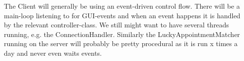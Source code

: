 The Client will generally be using an event-driven control flow. There will be a main-loop listening to for GUI-events and when an event happens it is handled by the relevant controller-class. We still might want to have several threads running, e.g. the ConnectionHandler. Similarly the LuckyAppointmentMatcher running on the server will probably be pretty procedural as it is run x times a day and never even waits events.

